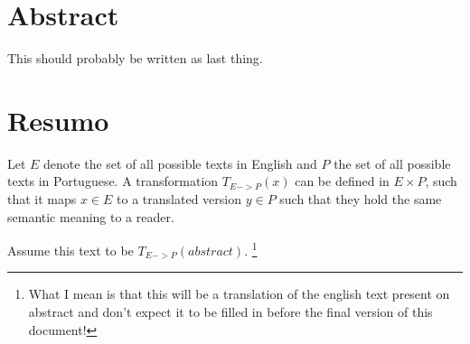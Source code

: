 \chapter*{Abstract}

This should probably be written as last thing.

\chapter*{Resumo}
Let $E$ denote the set of all possible texts in English and $P$ the set of
all possible texts in Portuguese. A transformation $T_{E->P}(x)$ can be defined
in $E \times P$, such that it maps $x \in E$ to a translated version $y \in P$ such
that they hold the same semantic meaning to a reader.

Assume this text to be $T_{E->P}(abstract)$.
\footnote{What I mean is that this will be a translation of the english text present
on abstract and don't expect it to be filled in before the final version of this
document!}

